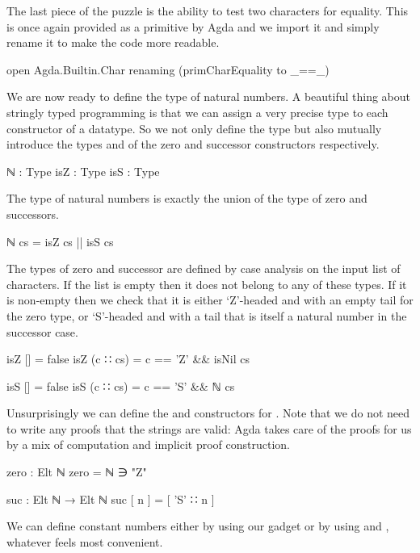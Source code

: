 \documentclass[twocolumn]{article}
\begin{document}
The last piece of the puzzle is the ability to test two characters
for equality. This is once again provided as a primitive by Agda and
we import it and simply rename it to make the code more readable.

\begin{code}
open Agda.Builtin.Char
  renaming (primCharEquality to _==_)
\end{code}

We are now ready to define the type of natural numbers. A beautiful
thing about stringly typed programming is that we can assign a very
precise type to each constructor of a datatype. So we not only define
the type  but also mutually introduce the types  and
 of the zero and successor constructors respectively.

\begin{code}
ℕ    : Type
isZ  : Type
isS  : Type
\end{code}

The type of natural numbers is exactly the union of the type of zero
and successors.

\begin{code}
ℕ cs = isZ cs || isS cs
\end{code}

The types of zero and successor are defined by case analysis on the
input list of characters. If the list is empty then it does not belong
to any of these types. If it is non-empty then we check that it is
either `Z'-headed and with an empty tail for the zero type,
or `S'-headed and with a tail that is itself a natural number in the
successor case.

\begin{code}
isZ [] = false
isZ (c ∷ cs) = c == 'Z' && isNil cs

isS [] = false
isS (c ∷ cs) = c == 'S' && ℕ cs
\end{code}

Unsurprisingly we can define the  and  constructors
for . Note that we do not need to write any proofs that the
strings are valid: Agda takes care of the proofs for us by a mix of
computation and implicit proof construction.

\begin{code}
zero : Elt ℕ
zero = ℕ ∋ "Z"

suc : Elt ℕ → Elt ℕ
suc [ n ] = [ 'S' ∷ n ]
\end{code}

We can define constant numbers either by using our  gadget or by
using  and , whatever feels most convenient.
\end{document}
